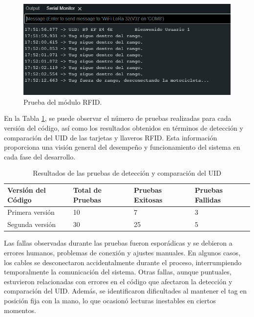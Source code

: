 \begin{figure}[H]
\leavevmode
\begin{minipage}{\textwidth}
\begin{center}
\includegraphics[width=\textwidth]{./capitulo_05/imagen/rfidprueba.png}
\caption{Prueba del módulo RFID.\label{fig:rfid}}
\end{center}
\end{minipage}
\end{figure}

En la Tabla \ref{tab:pruebas_uid}, se puede observar el número de pruebas realizadas para cada versión del código, así como los resultados obtenidos en términos de detección y comparación del UID de las tarjetas y llaveros RFID. Esta información proporciona una visión general del desempeño y funcionamiento del sistema en cada fase del desarrollo.

\begin{table}[H]
\centering
\renewcommand{\arraystretch}{1.3} %
\caption{Resultados de las pruebas de detección y comparación del UID}
\label{tab:pruebas_uid}
\begin{tabular}{|p{3cm}|p{2.65cm}|p{2cm}|p{2.4cm}|}
\hline
\textbf{Versión del Código} & \textbf{Total de Pruebas} & \textbf{Pruebas Exitosas} & \textbf{Pruebas Fallidas} \\ \hline
Primera versión             & 10                       & 7                         & 3                         \\ \hline
Segunda versión             & 30                       & 25                        & 5                         \\ \hline
\end{tabular}
\end{table}


Las fallas observadas durante las pruebas fueron esporádicas y se debieron a errores humanos, problemas de conexión y ajustes manuales. En algunos casos, los cables se desconectaron accidentalmente durante el proceso, interrumpiendo temporalmente la comunicación del sistema. Otras fallas, aunque puntuales, estuvieron relacionadas con errores en el código que afectaron la detección y comparación del UID. Además, se identificaron dificultades al mantener el tag en posición fija con la mano, lo que ocasionó lecturas inestables en ciertos momentos.


